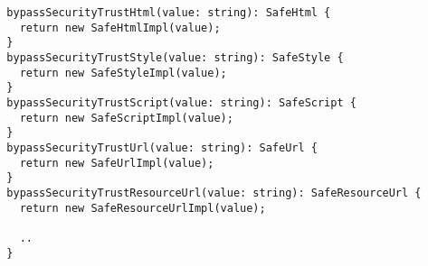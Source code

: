 \begin{verbatim}
  bypassSecurityTrustHtml(value: string): SafeHtml {
    return new SafeHtmlImpl(value);
  }
  bypassSecurityTrustStyle(value: string): SafeStyle {
    return new SafeStyleImpl(value);
  }
  bypassSecurityTrustScript(value: string): SafeScript {
    return new SafeScriptImpl(value);
  }
  bypassSecurityTrustUrl(value: string): SafeUrl {
    return new SafeUrlImpl(value);
  }
  bypassSecurityTrustResourceUrl(value: string): SafeResourceUrl {
    return new SafeResourceUrlImpl(value);

    ..
  }
\end{verbatim}
